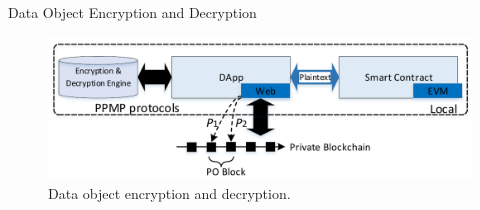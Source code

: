 \documentclass[11pt]{beamer}
\begin{document}
\begin{frame}[allowframebreaks]{Data Object Encryption and Decryption}

\begin{figure}
\includegraphics[scale=0.3]{dataobjectencdec.png}
\caption{Data object encryption and decryption.}
\label{fig:datobjencdec}
\end{figure}

\begin{itemize}


\end{itemize}
\end{frame}
\end{document}
